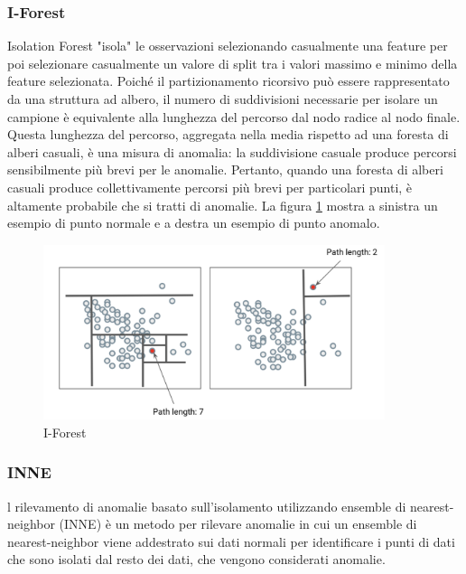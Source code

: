 \subsubsection{I-Forest}
Isolation Forest "isola" le osservazioni selezionando casualmente una feature per poi selezionare casualmente un valore di split tra i valori massimo e minimo della feature selezionata. 
Poiché il partizionamento ricorsivo può essere rappresentato da una struttura ad albero, il numero di suddivisioni necessarie per isolare un campione è equivalente alla lunghezza del percorso dal nodo radice al nodo finale.
Questa lunghezza del percorso, aggregata nella media rispetto ad una foresta di alberi casuali, è una misura di anomalia: la suddivisione casuale produce percorsi sensibilmente più brevi per le anomalie. Pertanto, quando una foresta di alberi casuali produce collettivamente percorsi più brevi per particolari punti, è altamente probabile che si tratti di anomalie.
La figura \ref{iforest} mostra a sinistra un esempio di punto normale e a destra un esempio di punto anomalo.
\begin{figure}[t]
	\centering
	\includegraphics[width=10cm, scale=1]{images/iforest}
	\caption{I-Forest}
	\label{iforest}
\end{figure}
\subsubsection{INNE}
l rilevamento di anomalie basato sull'isolamento utilizzando ensemble di nearest-neighbor (INNE) è un metodo per rilevare anomalie in cui un ensemble di nearest-neighbor viene addestrato sui dati normali per identificare i punti di dati che sono isolati dal resto dei dati, che vengono considerati anomalie.

